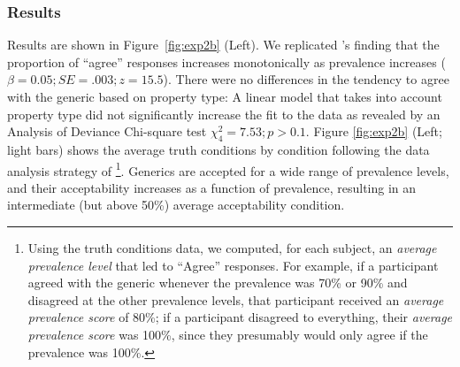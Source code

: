 \documentclass[10pt,letterpaper]{article}
\begin{document}
%

\subsubsection{Results}



Results are shown in Figure~\ref{fig:exp2b} (Left). 
We replicated 's finding that the proportion of ``agree'' responses increases monotonically as prevalence increases ($\beta=0.05; SE = .003; z = 15.5$). 
There were no differences in the tendency to agree with the generic based on property type: 
A linear model that takes into account property type did not significantly increase the fit to the data as revealed by an Analysis of Deviance Chi-square test $\chi^2_{4}=7.53; p > 0.1$.
Figure \ref{fig:exp2b} (Left; light bars) shows the average truth conditions by condition following the data analysis strategy of \citeauthor{Cimpian2010}\footnote{ 
Using the truth conditions data, we computed, for each subject, an \emph{average prevalence level} that led to ``Agree'' responses. 
For example, if a participant agreed with the generic whenever the prevalence was 70\% or 90\% and disagreed at the other prevalence levels, that participant received an \emph{average prevalence score} of 80\%; if a participant disagreed to everything, their \emph{average prevalence score} was 100\%, since they presumably would only agree if the prevalence was 100\%.}.
Generics are accepted for a wide range of prevalence levels, and their acceptability increases as a function of prevalence, resulting in an intermediate (but above 50\%) average acceptability condition.
\end{document}
